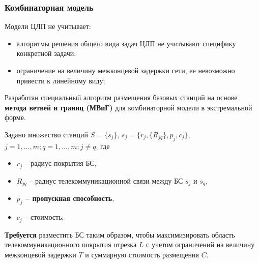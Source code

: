 \begin{frame}
    \frametitle{Комбинаторная модель}
    \justifying
    Модели ЦЛП не учитывает:
    \begin{itemize}
        \item алгоритмы решения общего вида задач ЦЛП не учитывают специфику конкретной задачи.
        \item ограничение на величину межконцевой задержки сети, ее невозможно привести к линейному виду;
    \end{itemize}
    

    \medskip
    Разработан специальный алгоритм размещения базовых станций на основе \textbf{метода ветвей и границ (МВиГ)} для комбинаторной модели в экстремальной форме.

    \medskip

    Задано множество станций $S = \{s_j\}$, $s_j=\{r_j,\{R_{jq} \},p_j, c_j \}$, $j=1,...,m;q=1,...,m;j \neq q $, где 
    \begin{itemize}
        \item $r_j$ -- радиус покрытия БС,
        \item $R_{jq}$ -- радиус телекоммуникационной связи между БС $s_j$ и $s_q$,
        \item \textbf{$p_j$ -- пропускная способность},
        \item $c_j$ -- стоимость;
    \end{itemize} 

    \medskip
    \textbf{Требуется} разместить БС таким образом, чтобы максимизировать область телекоммуникационного покрытия отрезка $L$ с учетом ограничений на величину межконцевой задержки $T$ и суммарную стоимость размещения $C$.


\end{frame}


